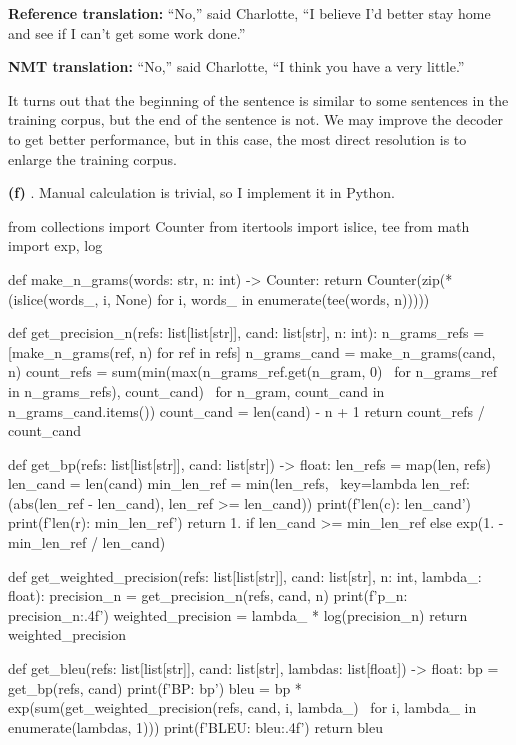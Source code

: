 \documentclass[a4paper,12pt]{report}
\newcommand{\rom}[1]{\expandafter{\romannumeral #1\relax}}
\begin{document}
\vspace{-.75em}

\textbf{Reference translation:} “No,” said Charlotte, “I believe I’d better stay home and see if I can’t get some work done.”

\vspace{-.75em}

\textbf{NMT translation:} “No,” said Charlotte, “I think you have a very little.”

It turns out that the beginning of the sentence is similar to some sentences in the training corpus, but the end of the sentence is not. We may improve the decoder to get better performance, but in this case, the most direct resolution is to enlarge the training corpus.

\textbf{(f)} \rom{1}. Manual calculation is trivial, so I implement it in Python.

\begin{python}
from collections import Counter
from itertools import islice, tee
from math import exp, log

def make_n_grams(words: str, n: int) -> Counter:
    return Counter(zip(*(islice(words_, i, None) for i, words_ in enumerate(tee(words, n)))))

def get_precision_n(refs: list[list[str]], cand: list[str], n: int):
    n_grams_refs = [make_n_grams(ref, n) for ref in refs]
    n_grams_cand = make_n_grams(cand, n)
    count_refs = sum(min(max(n_grams_ref.get(n_gram, 0) \
        for n_grams_ref in n_grams_refs), count_cand) \
        for n_gram, count_cand in n_grams_cand.items())
    count_cand = len(cand) - n + 1
    return count_refs / count_cand

def get_bp(refs: list[list[str]], cand: list[str]) -> float:
    len_refs = map(len, refs)
    len_cand = len(cand)
    min_len_ref = min(len_refs, \
        key=lambda len_ref: (abs(len_ref - len_cand), len_ref >= len_cand))
    print(f'len(c): {len_cand}')
    print(f'len(r): {min_len_ref}')
    return 1. if len_cand >= min_len_ref else exp(1. - min_len_ref / len_cand)

def get_weighted_precision(refs: list[list[str]], cand: list[str], n: int, lambda_: float):
    precision_n = get_precision_n(refs, cand, n)
    print(f'p_{n}: {precision_n:.4f}')
    weighted_precision = lambda_ * log(precision_n)
    return weighted_precision

def get_bleu(refs: list[list[str]], cand: list[str], lambdas: list[float]) -> float:
    bp = get_bp(refs, cand)
    print(f'BP: {bp}')
    bleu = bp * exp(sum(get_weighted_precision(refs, cand, i, lambda_) \
        for i, lambda_ in enumerate(lambdas, 1)))
    print(f'BLEU: {bleu:.4f}')
    return bleu
\end{python}
\end{document}

